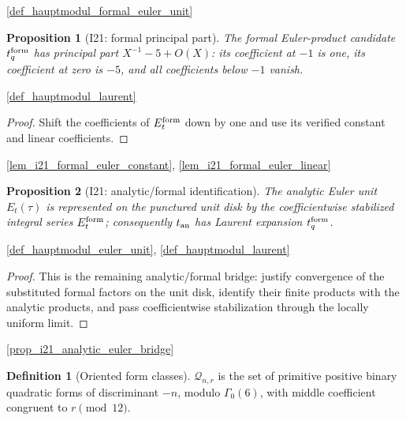 \documentclass[11pt,a4paper]{article}
\numberwithin{equation}{section}
\theoremstyle{plain}\newtheorem{theorem}{Theorem}[section]\newaliascnt{proposition}{theorem}\newtheorem{proposition}[proposition]{Proposition}\aliascntresetthe{proposition}\newaliascnt{lemma}{theorem}\newtheorem{lemma}[lemma]{Lemma}\aliascntresetthe{lemma}
\theoremstyle{definition}\newaliascnt{definition}{theorem}\newtheorem{definition}[definition]{Definition}\aliascntresetthe{definition}\newaliascnt{notation}{theorem}\newtheorem{notation}[notation]{Notation}\aliascntresetthe{notation}
\providecommand{\lean}[1]{}\providecommand{\leanok}{}
\begin{document}
\begin{uses-statement}\ref{def_hauptmodul_formal_euler_unit}\end{uses-statement}
\begin{proposition}[I21: formal principal part]\label{prop_i21_formal_principal_part}\lean{SptCM.Repair.hauptmodulFormalLaurent_principalPart}\leanok
The formal Euler-product candidate $t_q^{\rm form}$ has principal part
$X^{-1}-5+O(X)$: its coefficient at $-1$ is one, its coefficient at zero is
$-5$, and all coefficients below $-1$ vanish.
\end{proposition}
\begin{uses-statement}\ref{def_hauptmodul_laurent}\end{uses-statement}
\begin{proof}
Shift the coefficients of $E_t^{\rm form}$ down by one and use its verified
constant and linear coefficients.
\end{proof}
\begin{uses-proof}\ref{lem_i21_formal_euler_constant}, \ref{lem_i21_formal_euler_linear}\end{uses-proof}
\begin{proposition}[I21: analytic/formal identification]\label{prop_i21_analytic_formal_identification}\lean{SptCM.Repair.analyticHauptmodul_eq_integral_formal_expansion}\leanok
The analytic Euler unit $E_t(\tau)$ is represented on the punctured unit
disk by the coefficientwise stabilized integral series
$E_t^{\rm form}$; consequently $t_{\rm an}$ has Laurent expansion
$t_q^{\rm form}$.
\end{proposition}
\begin{uses-statement}\ref{def_hauptmodul_euler_unit}, \ref{def_hauptmodul_laurent}\end{uses-statement}
\begin{proof}
This is the remaining analytic/formal bridge: justify convergence of the
substituted formal factors on the unit disk, identify their finite products
with the analytic products, and pass coefficientwise stabilization through
the locally uniform limit.
\end{proof}
\begin{uses-proof}\ref{prop_i21_analytic_euler_bridge}\end{uses-proof}
\begin{definition}[Oriented form classes]\label{def_oriented_forms}\lean{SptCM.orientedForms}\leanok
$\mathcal Q_{n,r}$ is the set of primitive positive binary quadratic forms of discriminant $-n$, modulo $\Gamma_0(6)$, with middle coefficient congruent to $r\pmod{12}$.
\end{definition}
\end{document}
